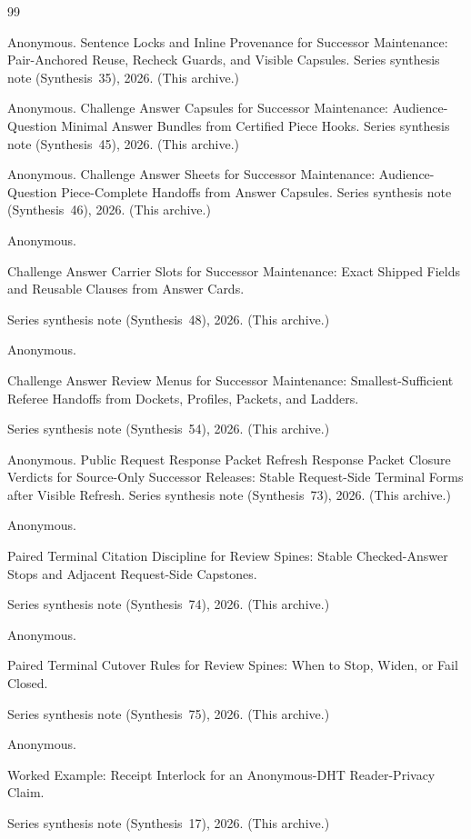 \documentclass[11pt]{article}
\begin{document}
\begin{thebibliography}{99}\small

Anonymous.
\newblock Sentence Locks and Inline Provenance for Successor Maintenance: Pair-Anchored Reuse, Recheck Guards, and Visible Capsules.
\newblock Series synthesis note (Synthesis~35), 2026. (This archive.)

Anonymous.
\newblock Challenge Answer Capsules for Successor Maintenance: Audience-Question Minimal Answer Bundles from Certified Piece Hooks.
\newblock Series synthesis note (Synthesis~45), 2026. (This archive.)

Anonymous.
\newblock Challenge Answer Sheets for Successor Maintenance: Audience-Question Piece-Complete Handoffs from Answer Capsules.
\newblock Series synthesis note (Synthesis~46), 2026. (This archive.)

Anonymous.

\newblock Challenge Answer Carrier Slots for Successor Maintenance: Exact Shipped Fields and Reusable Clauses from Answer Cards.

\newblock Series synthesis note (Synthesis~48), 2026. (This archive.)

Anonymous.

\newblock Challenge Answer Review Menus for Successor Maintenance: Smallest-Sufficient Referee Handoffs from Dockets, Profiles, Packets, and Ladders.

\newblock Series synthesis note (Synthesis~54), 2026. (This archive.)

Anonymous.
\newblock Public Request Response Packet Refresh Response Packet Closure Verdicts for Source-Only Successor Releases: Stable Request-Side Terminal Forms after Visible Refresh.
\newblock Series synthesis note (Synthesis~73), 2026. (This archive.)

Anonymous.

\newblock Paired Terminal Citation Discipline for Review Spines: Stable Checked-Answer Stops and Adjacent Request-Side Capstones.

\newblock Series synthesis note (Synthesis~74), 2026. (This archive.)

Anonymous.

\newblock Paired Terminal Cutover Rules for Review Spines: When to Stop, Widen, or Fail Closed.

\newblock Series synthesis note (Synthesis~75), 2026. (This archive.)

Anonymous.

\newblock Worked Example: Receipt Interlock for an Anonymous-DHT Reader-Privacy Claim.

\newblock Series synthesis note (Synthesis~17), 2026. (This archive.)

\end{thebibliography}
\end{document}
